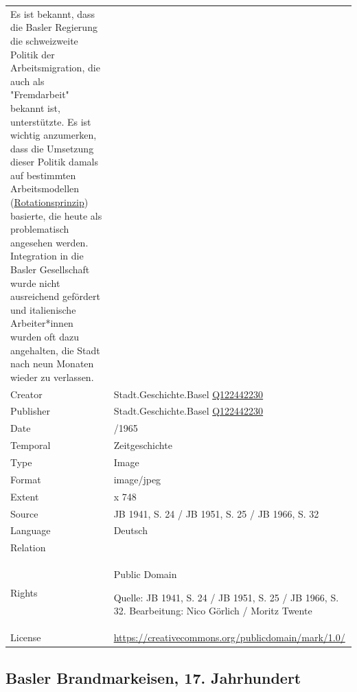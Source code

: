 \documentclass[
  letterpaper,
  DIV=11,
  numbers=noendperiod,
  landscape,
  a4paper,
  geometry:margin=1in]{scrartcl}
\begin{document}
\begin{longtable}[]{@{}
  >{\raggedright\arraybackslash}p{}
  >{\raggedright\arraybackslash}p{}@{}}
Es ist bekannt, dass die Basler Regierung die schweizweite Politik der
Arbeitsmigration, die auch als "Fremdarbeit" bekannt ist, unterstützte.
Es ist wichtig anzumerken, dass die Umsetzung dieser Politik damals auf
bestimmten Arbeitsmodellen
(\href{https://hls-dhs-dss.ch/de/articles/007991/2006-12-07/}{Rotationsprinzip})
basierte, die heute als problematisch angesehen werden. Integration in
die Basler Gesellschaft wurde nicht ausreichend gefördert und
italienische Arbeiter*innen wurden oft dazu angehalten, die Stadt nach
neun Monaten wieder zu verlassen. \textbar{} \\
Creator & Stadt.Geschichte.Basel
\href{https://www.wikidata.org/wiki/Q122442230}{Q122442230} \\
Publisher & Stadt.Geschichte.Basel
\href{https://www.wikidata.org/wiki/Q122442230}{Q122442230} \\
Date & 1920/1965 \\
Temporal & Zeitgeschichte \\
Type & Image \\
Format & image/jpeg \\
Extent & 1686 x 748 \\
Source & JB 1941, S. 24 / JB 1951, S. 25 / JB 1966, S. 32 \\
Language & Deutsch \\
Relation & \\
Rights & Public Domain

Quelle: JB 1941, S. 24 / JB 1951, S. 25 / JB 1966, S. 32. Bearbeitung:
Nico Görlich / Moritz Twente \\
License & \url{https://creativecommons.org/publicdomain/mark/1.0/} \\
\end{longtable}

\subsection{Basler Brandmarkeisen, 17.
Jahrhundert}\label{basler-brandmarkeisen-17.-jahrhundert}
\end{document}
